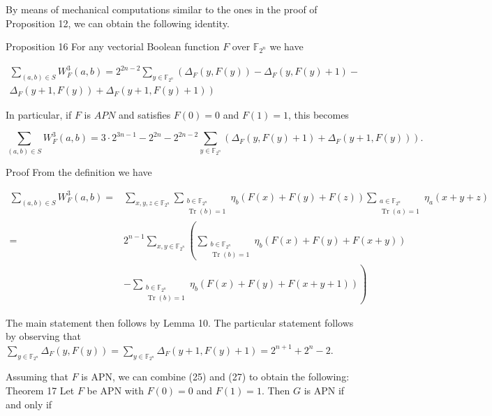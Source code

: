 \documentclass[10pt]{article}
\begin{document}
By means of mechanical computations similar to the ones in the proof of Proposition 12, we can obtain the following identity.

Proposition 16 For any vectorial Boolean function $F$ over $\mathbb{F}_{2^{n}}$ we have

\[
\begin{array}{r}
\sum_{(a, b) \in S} W_{F}^{3}(a, b)=2^{2 n-2} \sum_{y \in \mathbb{F}_{2^{n}}}\left(\Delta_{F}(y, F(y))-\Delta_{F}(y, F(y)+1)-\right. \\
\left.\Delta_{F}(y+1, F(y))+\Delta_{F}(y+1, F(y)+1)\right) \tag{26}
\end{array}
\]

In particular, if $F$ is $A P N$ and satisfies $F(0)=0$ and $F(1)=1$, this becomes


\begin{equation*}
\sum_{(a, b) \in S} W_{F}^{3}(a, b)=3 \cdot 2^{3 n-1}-2^{2 n}-2^{2 n-2} \sum_{y \in \mathbb{F}_{2^{n}}}\left(\Delta_{F}(y, F(y)+1)+\Delta_{F}(y+1, F(y))\right) . \tag{27}
\end{equation*}


Proof From the definition we have


\begin{align*}
\sum_{(a, b) \in S} W_{F}^{3}(a, b)= & \sum_{x, y, z \in \mathbb{F}_{2^{n}}} \sum_{\substack{b \in \mathbb{F}_{2^{n}} \\
\operatorname{Tr}(b)=1}} \eta_{b}(F(x)+F(y)+F(z)) \sum_{\substack{a \in \mathbb{F}_{2^{n}} \\
\operatorname{Tr}(a)=1}} \eta_{a}(x+y+z) \\
= & 2^{n-1} \sum_{x, y \in \mathbb{F}_{2^{n}}}\left(\sum_{\substack{b \in \mathbb{F}_{2^{n}} \\
\operatorname{Tr}(b)=1}} \eta_{b}(F(x)+F(y)+F(x+y))\right. \\
& \left.-\sum_{\substack{b \in \mathbb{F}_{2^{n}} \\
\operatorname{Tr}(b)=1}} \eta_{b}(F(x)+F(y)+F(x+y+1))\right) \tag{28}
\end{align*}


The main statement then follows by Lemma 10. The particular statement follows by observing that $\sum_{y \in \mathbb{F}_{2^{n}}} \Delta_{F}(y, F(y))=\sum_{y \in \mathbb{F}_{2^{n}}} \Delta_{F}(y+1, F(y)+1)=2^{n+1}+2^{n}-2$.

Assuming that $F$ is APN, we can combine (25) and (27) to obtain the following:\\
Theorem 17 Let $F$ be APN with $F(0)=0$ and $F(1)=1$. Then $G$ is APN if and only if
\end{document}

